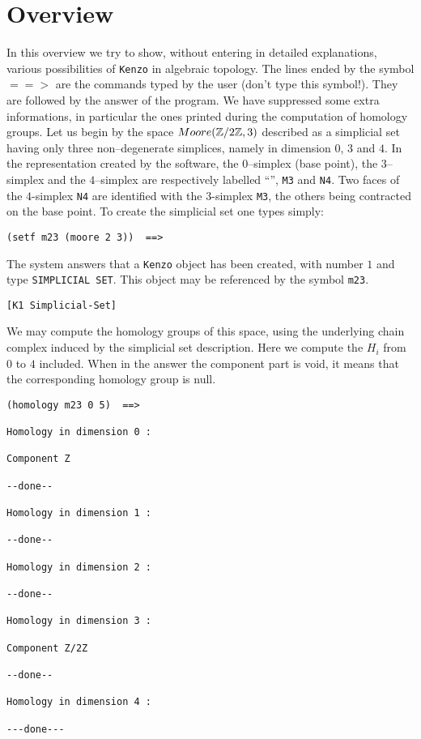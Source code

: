 \setcounter{chapter}{-1}
\chapter {Overview}

In this overview we try to  show, without entering in detailed
explanations, various possibilities of {\tt Kenzo} in algebraic topology.
The lines ended by the symbol $==>$ are the commands typed by the user 
(don't type this symbol!).
They are followed by the answer of the program. We have suppressed some
extra informations, in particular the ones printed during the computation
of homology groups.
\vskip 0.5cm
Let us begin by the space $Moore({{\Bbb Z}}/2{{\Bbb Z}}, 3)$ described as a simplicial set
having only three non--degenerate simplices, namely in dimension
$0$, $3$ and $4$. In the  representation created by the software, the $0$--simplex (base point),
the $3$--simplex and the $4$--simplex are respectively labelled
``{\tt *}'', {\tt M3} and {\tt N4}. Two faces of the $4$-simplex {\tt N4} are identified with the
$3$-simplex {\tt M3}, the others being contracted on the base point. To create the simplicial set
one types simply:
{\footnotesize\begin{verbatim}
(setf m23 (moore 2 3))  ==>
\end{verbatim}}
The system answers that a {\tt Kenzo} object has been created, with number $1$ and
type {\tt SIMPLICIAL SET}. This object may be referenced  by the symbol {\tt m23}.
{\footnotesize\begin{verbatim}
[K1 Simplicial-Set]
\end{verbatim}}
We may compute the homology groups of this space, using the underlying chain complex
induced by the simplicial set description. Here we compute the $ H_i$ from $0$ to $4$ included.
When in the answer the component part is void, it means that the corresponding homology group is null.
{\footnotesize\begin{verbatim}
(homology m23 0 5)  ==>

Homology in dimension 0 :

Component Z

--done--

Homology in dimension 1 :

--done--

Homology in dimension 2 :

--done--

Homology in dimension 3 :

Component Z/2Z

--done--

Homology in dimension 4 :

---done---
\end{verbatim}}
